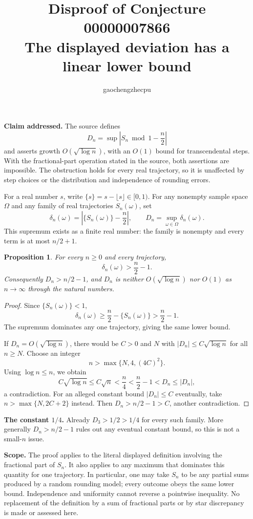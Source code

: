 \documentclass[11pt]{article}
\title{Disproof of Conjecture 00000007866\\The displayed deviation has a linear lower bound}
\author{gaochengzhecpu}
\date{}
\newtheorem{proposition}{Proposition}
\begin{document}
\maketitle
\noindent\textbf{Claim addressed.} The source defines
\[
 D_n=\sup\left|S_n\bmod1-\frac n2\right|
\]
and asserts growth $O(\sqrt{\log n})$, with an $O(1)$ bound for transcendental steps. With the fractional-part operation stated in the source, both assertions are impossible. The obstruction holds for every real trajectory, so it is unaffected by step choices or the distribution and independence of rounding errors.

For a real number $s$, write $\{s\}=s-\lfloor s\rfloor\in[0,1)$. For any nonempty sample space $\Omega$ and any family of real trajectories $S_n(\omega)$, set
\[
 \delta_n(\omega)=\left|\{S_n(\omega)\}-\frac n2\right|,
 \qquad D_n=\sup_{\omega\in\Omega}\delta_n(\omega).
\]
This supremum exists as a finite real number: the family is nonempty and every term is at most $n/2+1$.

\begin{proposition}
For every $n\ge0$ and every trajectory,
\[
 \delta_n(\omega)>\frac n2-1.
\]
Consequently $D_n>n/2-1$, and $D_n$ is neither $O(\sqrt{\log n})$ nor $O(1)$ as $n\to\infty$ through the natural numbers.
\end{proposition}
\begin{proof}
Since $\{S_n(\omega)\}<1$,
\[
 \delta_n(\omega)\ge\frac n2-\{S_n(\omega)\}>\frac n2-1.
\]
The supremum dominates any one trajectory, giving the same lower bound.

If $D_n=O(\sqrt{\log n})$, there would be $C>0$ and $N$ with $|D_n|\le C\sqrt{\log n}$ for all $n\ge N$. Choose an integer
\[
 n>\max\{N,4,(4C)^2\}.
\]
Using $\log n\le n$, we obtain
\[
 C\sqrt{\log n}\le C\sqrt n<\frac n4
 <\frac n2-1<D_n\le |D_n|,
\]
a contradiction. For an alleged constant bound $|D_n|\le C$ eventually, take $n>\max\{N,2C+2\}$ instead. Then $D_n>n/2-1>C$, another contradiction.
\end{proof}

\noindent\textbf{The constant $1/4$.} Already $D_3>1/2>1/4$ for every such family. More generally $D_n>n/2-1$ rules out any eventual constant bound, so this is not a small-$n$ issue.

\noindent\textbf{Scope.} The proof applies to the literal displayed definition involving the fractional part of $S_n$. It also applies to any maximum that dominates this quantity for one trajectory. In particular, one may take $S_n$ to be any partial sums produced by a random rounding model; every outcome obeys the same lower bound. Independence and uniformity cannot reverse a pointwise inequality. No replacement of the definition by a sum of fractional parts or by star discrepancy is made or assessed here.
\end{document}
